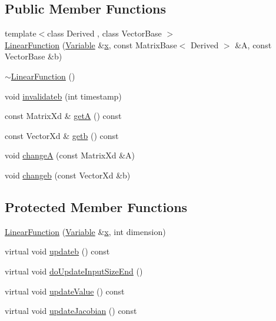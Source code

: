 \subsection*{Public Member Functions}
\begin{DoxyCompactItemize}
\item 
{\footnotesize template$<$class Derived , class Vector\+Base $>$ }\\\hyperlink{classocra_1_1LinearFunction_afb4fddc341c3c726f346acc962bead78}{Linear\+Function} (\hyperlink{classocra_1_1Variable}{Variable} \&\hyperlink{classocra_1_1Function_a28825886d1f149c87b112ec2ec1dd486}{x}, const Matrix\+Base$<$ Derived $>$ \&A, const Vector\+Base \&b)
\item 
\hyperlink{classocra_1_1LinearFunction_a0bdb80bc2a85566bc02dd143b6db7fdf}{$\sim$\+Linear\+Function} ()
\item 
void \hyperlink{classocra_1_1LinearFunction_a3faf4257b2a8ebd6426a054f4242fec8}{invalidateb} (int timestamp)
\end{DoxyCompactItemize}
{\bf }\par
\begin{DoxyCompactItemize}
\item 
const Matrix\+Xd \& \hyperlink{classocra_1_1LinearFunction_a95b60ee4e865fb2b06e94ea6b7161d57}{getA} () const 
\item 
const Vector\+Xd \& \hyperlink{classocra_1_1LinearFunction_a6df1c69a47bb4f0621e0fdbc022fdd71}{getb} () const 
\item 
void \hyperlink{classocra_1_1LinearFunction_ab3ce18953520f3984fc260444775d157}{changeA} (const Matrix\+Xd \&A)
\item 
void \hyperlink{classocra_1_1LinearFunction_a2c62940f1529c04b4888a2f4d4bc235d}{changeb} (const Vector\+Xd \&b)
\end{DoxyCompactItemize}

\subsection*{Protected Member Functions}
\begin{DoxyCompactItemize}
\item 
\hyperlink{classocra_1_1LinearFunction_af44da8931811a95725d1d25c697aa5d2}{Linear\+Function} (\hyperlink{classocra_1_1Variable}{Variable} \&\hyperlink{classocra_1_1Function_a28825886d1f149c87b112ec2ec1dd486}{x}, int dimension)
\item 
virtual void \hyperlink{classocra_1_1LinearFunction_a9857f074ea269801ce6f595b69593b32}{updateb} () const 
\item 
virtual void \hyperlink{classocra_1_1LinearFunction_ac6bdf62ad6634397778d5f4223ed6d82}{do\+Update\+Input\+Size\+End} ()
\end{DoxyCompactItemize}
{\bf }\par
\begin{DoxyCompactItemize}
\item 
virtual void \hyperlink{classocra_1_1LinearFunction_a1866f014864a272dc01c4d81d3a5fe03}{update\+Value} () const 
\item 
virtual void \hyperlink{classocra_1_1LinearFunction_a544c87a4f02b4d80ae70e53b80c74461}{update\+Jacobian} () const 
\end{DoxyCompactItemize}

